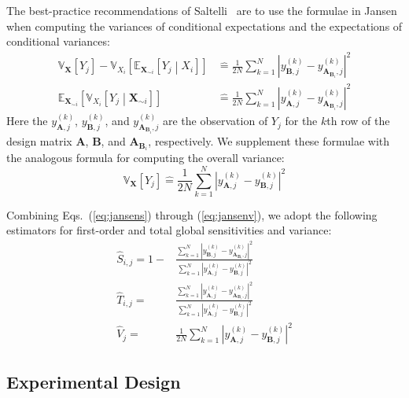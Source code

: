 \documentclass[12pt]{article}
\begin{document}
The best-practice recommendations of Saltelli~\cite{saltelli_variance_2010} are to use the formulae in Jansen~\cite{jansen_analysis_1999} when computing the variances of conditional expectations and the expectations of conditional variances:
\begin{align}
    \mathbb{V}_\mathbf{X} \left[ Y_j \right] - \mathbb{V}_{X_i} \left[ \mathbb{E}_{\mathbf{X}_{\sim i}} \left[ Y_j \middle| X_i \right] \right] & \mathrel{\hat=} \frac{1}{2 N} \sum_{k=1}^N \left| y_{\mathbf{B},j}^{(k)} - y_{\mathbf{A}_{\mathbf{B}_i},j}^{(k)} \right|^2 \label{eq:jansens}
    \\
    \mathbb{E}_{\mathbf{X}_{\sim i}} \left[ \mathbb{V}_{X_i} \left[ Y_j \middle| \mathbf{X}_{\sim i} \right] \right] & \mathrel{\hat=} \frac{1}{2 N} \sum_{k=1}^N \left| y_{\mathbf{A},j}^{(k)} - y_{\mathbf{A}_{\mathbf{B}_i},j}^{(k)} \right|^2 \label{eq:jansent}
\end{align}
Here the $y_{\mathbf{A},j}^{(k)}$, $y_{\mathbf{B},j}^{(k)}$, and $y_{\mathbf{A}_{\mathbf{B}_i},j}^{(k)}$ are the observation of $Y_j$ for the $k$th row of the design matrix $\mathbf{A}$, $\mathbf{B}$, and $\mathbf{A}_{\mathbf{B}_i}$, respectively. We supplement these formulae with the analogous formula for computing the overall variance:
\begin{equation}
    \mathbb{V}_\mathbf{X} \left[ Y_j \right] \mathrel{\hat=} \frac{1}{2 N} \sum_{k=1}^N \left| y_{\mathbf{A},j}^{(k)} - y_{\mathbf{B},j}^{(k)} \right|^2 \label{eq:jansenv}
\end{equation}

Combining Eqs.~(\ref{eq:jansens}) through (\ref{eq:jansenv}), we adopt the following estimators for first-order and total global sensitivities and variance:
\begin{align}
    \hat{S}_{i,j} = 1 - & \frac{\sum_{k=1}^N \left| y_{\mathbf{B},j}^{(k)} - y_{\mathbf{A}_{\mathbf{B}_i},j}^{(k)} \right|^2}{\sum_{k=1}^N \left| y_{\mathbf{A},j}^{(k)} - y_{\mathbf{B},j}^{(k)} \right|^2} \label{eq:ours}
    \\
    \hat{T}_{i,j} = & \frac{\sum_{k=1}^N \left| y_{\mathbf{A},j}^{(k)} - y_{\mathbf{A}_{\mathbf{B}_i},j}^{(k)} \right|^2}{\sum_{k=1}^N \left| y_{\mathbf{A},j}^{(k)} - y_{\mathbf{B},j}^{(k)} \right|^2} \label{eq:ourt}
    \\
    \hat{V}_{j} = & \frac{1}{2 N} \sum_{k=1}^N \left| y_{\mathbf{A},j}^{(k)} - y_{\mathbf{B},j}^{(k)} \right|^2 \label{eq:ourv}
\end{align}


\subsection{Experimental Design}
\end{document}

